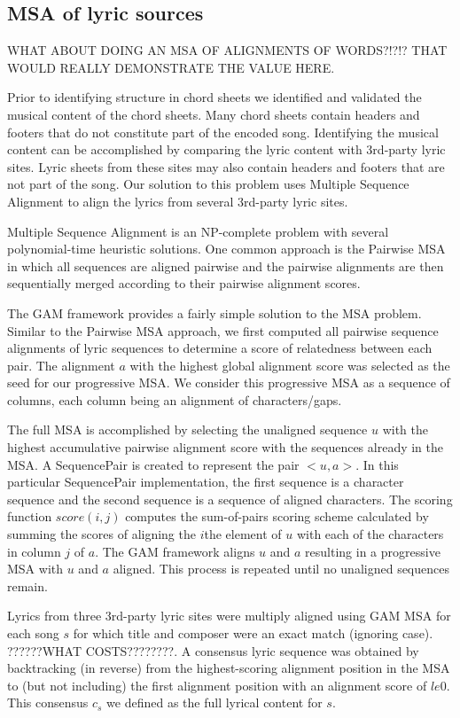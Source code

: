 \documentclass[12pt]{article}
\begin{document}
\subsection{MSA of lyric sources}

WHAT ABOUT DOING AN MSA OF ALIGNMENTS OF WORDS?!?!? THAT WOULD REALLY DEMONSTRATE THE VALUE HERE.

Prior to identifying structure in chord sheets we identified and validated the musical content of the chord sheets. Many chord sheets contain headers and footers that do not constitute part of the encoded song. Identifying the musical content can be accomplished by comparing the lyric content with 3rd-party lyric sites. Lyric sheets from these sites may also contain headers and footers that are not part of the song. Our solution to this problem uses Multiple Sequence Alignment to align the lyrics from several 3rd-party lyric sites.

Multiple Sequence Alignment is an NP-complete problem with several polynomial-time heuristic solutions. One common approach is the Pairwise MSA in which all sequences are aligned pairwise and the pairwise alignments are then sequentially merged according to their pairwise alignment scores.

The GAM framework provides a fairly simple solution to the MSA problem. Similar to the Pairwise MSA approach, we first computed all pairwise sequence alignments of lyric sequences to determine a score of relatedness between each pair. The alignment $a$ with the highest global alignment score was selected as the seed for our progressive MSA. We consider this progressive MSA as a sequence of columns, each column being an alignment of characters/gaps. 

The full MSA is accomplished by selecting the unaligned sequence $u$ with the highest accumulative pairwise alignment score with the sequences already in the MSA. A SequencePair is created to represent the pair $<u,a>$. In this particular SequencePair implementation, the first sequence is a character sequence and the second sequence is a sequence of aligned characters. The scoring function $score(i,j)$ computes the sum-of-pairs scoring scheme calculated by summing the scores of aligning the $i$the element of $u$ with each of the characters in column $j$ of $a$. The GAM framework aligns $u$ and $a$ resulting in a progressive MSA with $u$ and $a$ aligned. This process is repeated until no unaligned sequences remain.

Lyrics from three 3rd-party lyric sites were multiply aligned using GAM MSA for each song $s$ for which title and composer were an exact match (ignoring case). ??????WHAT COSTS????????. A consensus lyric sequence was obtained by backtracking (in reverse) from the highest-scoring alignment position in the MSA to (but not including) the first alignment position with an alignment score of $le 0$. This consensus $c_s$ we defined as the full lyrical content for $s$.
\end{document}
